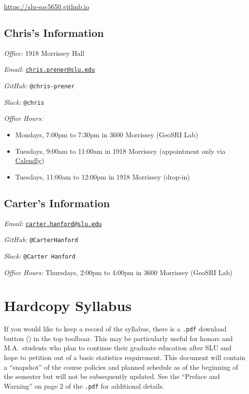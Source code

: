 \documentclass[]{book}
\providecommand{\tightlist}{%
  \setlength{\itemsep}{0pt}\setlength{\parskip}{0pt}}
\begin{document}
\url{https://slu-soc5650.github.io}

\hypertarget{chriss-information}{%
\subsection*{Chris's Information}\label{chriss-information}}

\emph{Office:} 1918 Morrissey Hall

\emph{Email:} \href{mailto:chris.prener@slu.edu}{\nolinkurl{chris.prener@slu.edu}}

\emph{GitHub:} \texttt{@chris-prener}

\emph{Slack:} \texttt{@chris}

\emph{Office Hours:}

\begin{itemize}
\tightlist
\item
  Mondays, 7:00pm to 7:30pm in 3600 Morrissey (GeoSRI Lab)
\item
  Tuesdays, 9:00am to 11:00am in 1918 Morrissey (appointment only via \href{https://calendly.com/chris-prener}{Calendly})
\item
  Tuesdays, 11:00am to 12:00pm in 1918 Morrissey (drop-in)
\end{itemize}

\hypertarget{carters-information}{%
\subsection*{Carter's Information}\label{carters-information}}

\emph{Email:} \href{mailto:carter.hanford@slu.edu}{\nolinkurl{carter.hanford@slu.edu}}

\emph{GitHub:} \texttt{@CarterHanford}

\emph{Slack:} \texttt{@Carter\ Hanford}

\emph{Office Hours:} Thursdays, 2:00pm to 4:00pm in 3600 Morrissey (GeoSRI Lab)

\hypertarget{hardcopy-syllabus}{%
\section*{Hardcopy Syllabus}\label{hardcopy-syllabus}}

If you would like to keep a record of the syllabus, there is a \texttt{.pdf} download button () in the top toolboar. This may be particularly useful for honors and M.A.~students who plan to continue their graduate education after SLU and hope to petition out of a basic statistics requirement. This document will contain a ``snapshot'' of the course policies and planned schedule as of the beginning of the semester but will not be subsequently updated. See the ``Preface and Warning'' on page 2 of the \texttt{.pdf} for additional details.
\end{document}
